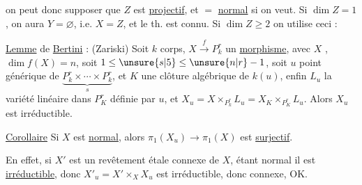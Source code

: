 on peut donc supposer que
$Z$ est \uline{projectif},  et $=$ \uline{normal}
si on veut. Si  $\dim Z=1$, on aura $Y=\varnothing$,
i.e. $X=Z$, et le th. est connu. Si $\dim Z\geq 2$
on utilise ceci :

\uline{Lemme} de \uline{Bertini} : (Zariski) Soit $k$ corps,
$X\xrightarrow{f}P^r_k$ un \uline{morphisme}, avec $X$ ,
$\dim f(X)=n$, soit $1\leq\unsure{s|5}\leq\unsure{n|r}-1$,  soit
$u$  point générique de $\underbrace{P^r_k\times\cdots\times P^r_k}_{s}$, et
$K$ une clôture algébrique de $k(u)$, enfin
$L_u$ la variété linéaire dans $P^r_K$ définie
par $u$, et $X_u=X\times_{P^r_k}L_u=X_K\times_{P^r_K} L_u$.
Alors $X_u$ est irréductible.


\uline{Corollaire}  Si $X$ est \uline{normal},
alors $\pi_1(X_u)\to\pi_1(X)$ est \uline{surjectif}.

En effet, si $X'$ est un revêtement 
étale connexe de $X$, étant normal il est
\uline{irréductible}, donc $X'_u=X'\times_X X_u$ est
irréductible, donc connexe, OK.
